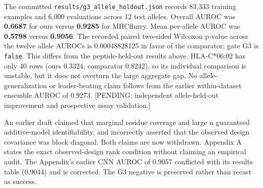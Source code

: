 The committed \texttt{results/g3\_allele\_holdout.json} records 83,333 training examples and 6,000 evaluations across 12 test alleles. Overall AUROC was \textbf{0.6687} for ours versus \textbf{0.9285} for MHCflurry. Mean per-allele AUROC was \textbf{0.5798} versus \textbf{0.9056}. The recorded paired two-sided Wilcoxon p-value across the twelve allele AUROCs is 0.00048828125 in favor of the comparator; gate G3 is \texttt{false}. This differs from the peptide-held-out results above. HLA-C*06:02 has only 40 rows (ours 0.3324, comparator 0.8242), so its individual comparison is unstable, but it does not overturn the large aggregate gap. No allele-generalization or leader-beating claim follows from the earlier within-dataset ensemble AUROC of 0.9273. {[}PENDING: independent allele-held-out improvement and prospective assay validation.{]}


An earlier draft claimed that marginal residue coverage and large n guaranteed additive-model identifiability, and incorrectly asserted that the observed design covariance was block diagonal. Both claims are now withdrawn. Appendix A states the exact observed-design rank condition without claiming an empirical audit. The Appendix's earlier CNN AUROC of 0.9057 conflicted with its results table (0.9044) and is corrected. The G3 negative is preserved rather than recast as success.
